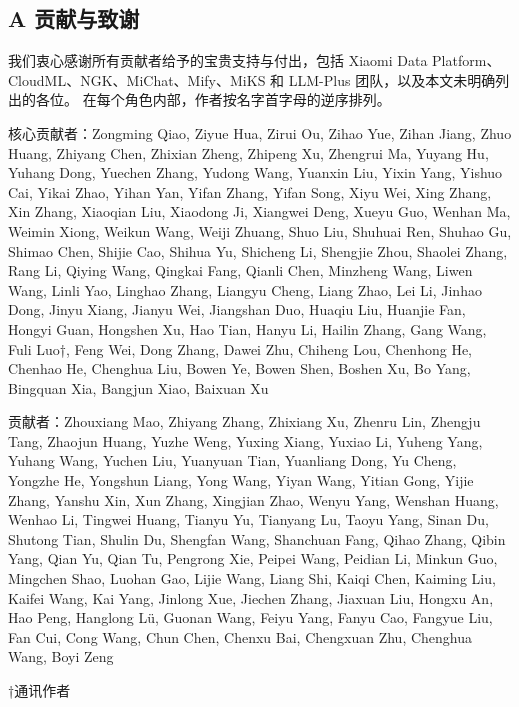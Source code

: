 \subsection{A 贡献与致谢}\label{a-contributions-and-acknowledgments}

我们衷心感谢所有贡献者给予的宝贵支持与付出，包括 Xiaomi Data Platform、
CloudML、NGK、MiChat、Mify、MiKS 和 LLM-Plus 团队，以及本文未明确列出的各位。
在每个角色内部，作者按名字首字母的逆序排列。

核心贡献者：Zongming Qiao, Ziyue Hua, Zirui Ou, Zihao Yue, Zihan
Jiang, Zhuo Huang, Zhiyang Chen, Zhixian Zheng, Zhipeng Xu, Zhengrui Ma,
Yuyang Hu, Yuhang Dong, Yuechen Zhang, Yudong Wang, Yuanxin Liu, Yixin
Yang, Yishuo Cai, Yikai Zhao, Yihan Yan, Yifan Zhang, Yifan Song, Xiyu
Wei, Xing Zhang, Xin Zhang, Xiaoqian Liu, Xiaodong Ji, Xiangwei Deng,
Xueyu Guo, Wenhan Ma, Weimin Xiong, Weikun Wang, Weiji Zhuang, Shuo Liu,
Shuhuai Ren, Shuhao Gu, Shimao Chen, Shijie Cao, Shihua Yu, Shicheng Li,
Shengjie Zhou, Shaolei Zhang, Rang Li, Qiying Wang, Qingkai Fang, Qianli
Chen, Minzheng Wang, Liwen Wang, Linli Yao, Linghao Zhang, Liangyu
Cheng, Liang Zhao, Lei Li, Jinhao Dong, Jinyu Xiang, Jianyu Wei,
Jiangshan Duo, Huaqiu Liu, Huanjie Fan, Hongyi Guan, Hongshen Xu, Hao
Tian, Hanyu Li, Hailin Zhang, Gang Wang, Fuli Luo†, Feng Wei, Dong
Zhang, Dawei Zhu, Chiheng Lou, Chenhong He, Chenhao He, Chenghua Liu,
Bowen Ye, Bowen Shen, Boshen Xu, Bo Yang, Bingquan Xia, Bangjun Xiao,
Baixuan Xu

贡献者：Zhouxiang Mao, Zhiyang Zhang, Zhixiang Xu, Zhenru Lin,
Zhengju Tang, Zhaojun Huang, Yuzhe Weng, Yuxing Xiang, Yuxiao Li, Yuheng
Yang, Yuhang Wang, Yuchen Liu, Yuanyuan Tian, Yuanliang Dong, Yu Cheng,
Yongzhe He, Yongshun Liang, Yong Wang, Yiyan Wang, Yitian Gong, Yijie
Zhang, Yanshu Xin, Xun Zhang, Xingjian Zhao, Wenyu Yang, Wenshan Huang,
Wenhao Li, Tingwei Huang, Tianyu Yu, Tianyang Lu, Taoyu Yang, Sinan Du,
Shutong Tian, Shulin Du, Shengfan Wang, Shanchuan Fang, Qihao Zhang,
Qibin Yang, Qian Yu, Qian Tu, Pengrong Xie, Peipei Wang, Peidian Li,
Minkun Guo, Mingchen Shao, Luohan Gao, Lijie Wang, Liang Shi, Kaiqi
Chen, Kaiming Liu, Kaifei Wang, Kai Yang, Jinlong Xue, Jiechen Zhang,
Jiaxuan Liu, Hongxu An, Hao Peng, Hanglong Lü, Guonan Wang, Feiyu Yang,
Fanyu Cao, Fangyue Liu, Fan Cui, Cong Wang, Chun Chen, Chenxu Bai,
Chengxuan Zhu, Chenghua Wang, Boyi Zeng

†通讯作者
